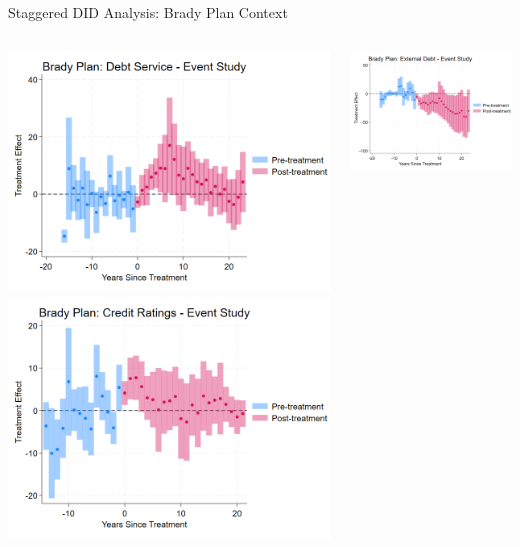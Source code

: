 \documentclass{beamer}
\begin{document}
\begin{frame}{Staggered DID Analysis: Brady Plan Context}
  \begin{columns}
    \begin{column}{0.45\textwidth}
      \centering
      \includegraphics[width=0.9\linewidth]{figures/CS_Brady_DebtService_EventStudy.png}
      \includegraphics[width=0.9\linewidth]{figures/CS_Brady_Ratings_EventStudy.png}
    \end{column}
    \begin{column}{0.45\textwidth}
      \centering
      \includegraphics[width=0.9\linewidth]{figures/CS_Brady_ExtDebt_EventStudy.png}

\end{column}
\end{columns}
\end{frame}
\end{document}

